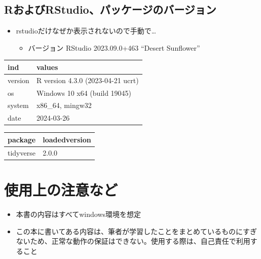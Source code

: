 \documentclass[
  b5paper,
  xelatex, ja=standard]{bxjsbook}
\providecommand{\tightlist}{%
  \setlength{\itemsep}{0pt}\setlength{\parskip}{0pt}}\usepackage{longtable,booktabs,array}
\begin{document}
\subsection*{RおよびRStudio、パッケージのバージョン}\label{rux304aux3088ux3073rstudioux30d1ux30c3ux30b1ux30fcux30b8ux306eux30d0ux30fcux30b8ux30e7ux30f3}

\begin{itemize}
\tightlist
\item
  rstudioだけなぜか表示されないので手動で\ldots{}

  \begin{itemize}
  \tightlist
  \item
    バージョン RStudio 2023.09.0+463 ``Desert Sunflower''
  \end{itemize}
\end{itemize}

\begin{table}
\centering
\begin{tabular}{l|l}
\hline
ind & values\\
\hline
version & R version 4.3.0 (2023-04-21 ucrt)\\
\hline
os & Windows 10 x64 (build 19045)\\
\hline
system & x86\_64, mingw32\\
\hline
date & 2024-03-26\\
\hline
\end{tabular}
\end{table}

\begin{table}
\centering
\begin{tabular}{l|l}
\hline
package & loadedversion\\
\hline
tidyverse & 2.0.0\\
\hline
\end{tabular}
\end{table}

\section*{使用上の注意など}\label{ux4f7fux7528ux4e0aux306eux6ce8ux610fux306aux3069}


\begin{itemize}
\item
  本書の内容はすべてwindows環境を想定
\item
  この本に書いてある内容は、筆者が学習したことをまとめているものにすぎないため、正常な動作の保証はできない。使用する際は、自己責任で利用すること
\end{itemize}
\end{document}
